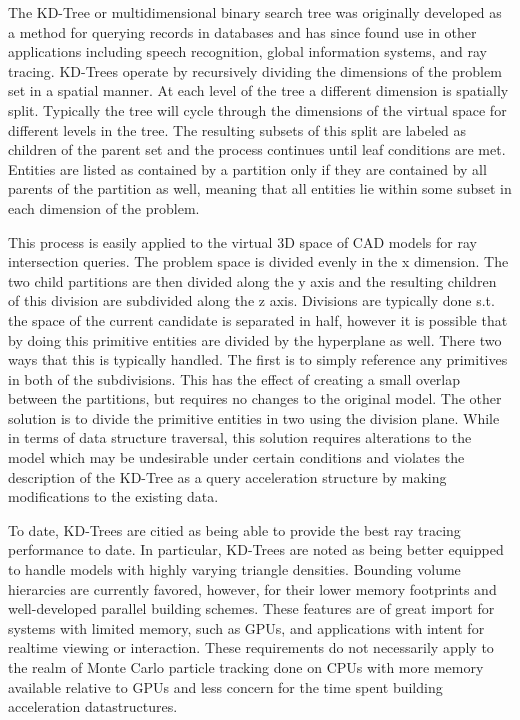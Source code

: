 \documentclass[12pt, a4paper]{article}
\begin{document}
The KD-Tree or multidimensional binary search tree was originally developed as a method for querying records in databases and has since found use in other applications including speech recognition, global information systems, and ray tracing. \cite{Bentley1975} KD-Trees operate by recursively dividing the dimensions of the problem set in a spatial manner. At each level of the tree a different dimension is spatially split. Typically the tree will cycle through the dimensions of the virtual space for different levels in the tree. The resulting subsets of this split are labeled as children of the parent set and the process continues until leaf conditions are met. Entities are listed as contained by a partition only if they are contained by all parents of the partition as well, meaning that all entities lie within some subset in each dimension of the problem.

This process is easily applied to the virtual 3D space of CAD models for ray intersection queries. The problem space is divided evenly in the x dimension. The two child partitions are then divided along the y axis and the resulting children of this division are subdivided along the z axis. Divisions are typically done s.t. the space of the current candidate is separated in half, however it is possible that by doing this primitive entities are divided by the hyperplane as well. There two ways that this is typically handled. The first is to simply reference any primitives in both of the subdivisions. This has the effect of creating a small overlap between the partitions, but requires no changes to the original model. The other solution is to divide the primitive entities in two using the division plane. While in terms of data structure traversal, this solution requires alterations to the model which may be undesirable under certain conditions and violates the description of the KD-Tree as a query acceleration structure by making modifications to the existing data.

To date, KD-Trees are citied as being able to provide the best ray tracing performance to date. In particular, KD-Trees are noted as being better equipped to handle models with highly varying triangle densities. Bounding volume hierarcies are currently favored, however, for their lower memory footprints and well-developed parallel building schemes. These features are of great import for systems with limited memory, such as GPUs, and applications with intent for realtime viewing or interaction. These requirements do not necessarily apply to the realm of Monte Carlo particle tracking done on CPUs with more memory available relative to GPUs and less concern for the time spent building acceleration datastructures.
\end{document}
